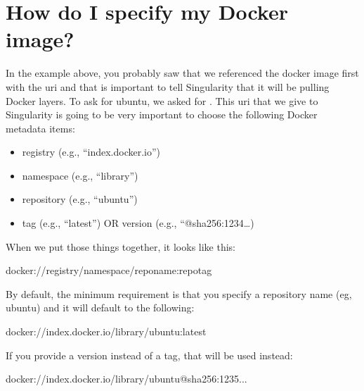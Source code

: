 \documentclass[letterpaper,10pt,english]{sphinxmanual}
\begin{document}
\section{How do I specify my Docker image?}
\label{\detokenize{singularity_and_docker:how-do-i-specify-my-docker-image}}
In the example above, you probably saw that we referenced the docker
image first with the uri  and that is important to tell Singularity that
it will be pulling Docker layers. To ask for ubuntu, we asked for  . This
uri that we give to Singularity is going to be very important to choose
the following Docker metadata items:
\begin{itemize}
\item {} 
registry (e.g., “index.docker.io”)

\item {} 
namespace (e.g., “library”)

\item {} 
repository (e.g., “ubuntu”)

\item {} 
tag (e.g., “latest”) OR version (e.g., “@sha256:1234…)

\end{itemize}

When we put those things together, it looks like this:

%
\begin{sphinxVerbatim}[commandchars=\\\{\}]
docker://\PYGZlt{}registry\PYGZgt{}/\PYGZlt{}namespace\PYGZgt{}/\PYGZlt{}repo\PYGZus{}name\PYGZgt{}:\PYGZlt{}repo\PYGZus{}tag\PYGZgt{}
\end{sphinxVerbatim}

By default, the minimum requirement is that you specify a repository
name (eg, ubuntu) and it will default to the following:

%
\begin{sphinxVerbatim}[commandchars=\\\{\}]
docker://index.docker.io/library/ubuntu:latest
\end{sphinxVerbatim}

If you provide a version instead of a tag, that will be used instead:

%
\begin{sphinxVerbatim}[commandchars=\\\{\}]
docker://index.docker.io/library/ubuntu@sha256:1235...
\end{sphinxVerbatim}
\end{document}
